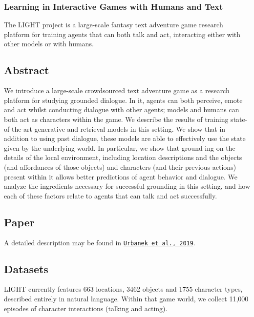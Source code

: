 \subsubsection*{Learning in Interactive Games with Humans and Text}



The L\+I\+G\+HT project is a large-\/scale fantasy text adventure game research platform for training agents that can both talk and act, interacting either with other models or with humans.

\subsection*{Abstract}

We introduce a large-\/scale crowdsourced text adventure game as a research platform for studying grounded dialogue. In it, agents can both perceive, emote and act whilst conducting dialogue with other agents; models and humans can both act as characters within the game. We describe the results of training state-\/of-\/the-\/art generative and retrieval models in this setting. We show that in addition to using past dialogue, these models are able to effectively use the state given by the underlying world. In particular, we show that ground-\/ing on the details of the local environment, including location descriptions and the objects (and affordances of those objects) and characters (and their previous actions) present within it allows better predictions of agent behavior and dialogue. We analyze the ingredients necessary for successful grounding in this setting, and how each of these factors relate to agents that can talk and act successfully.



\subsection*{Paper}

A detailed description may be found in \href{https://arxiv.org/abs/1903.03094}{\tt Urbanek et al., 2019}.

\subsection*{Datasets}

L\+I\+G\+HT currently features 663 locations, 3462 objects and 1755 character types, described entirely in natural language. Within that game world, we collect 11,000 episodes of character interactions (talking and acting).

